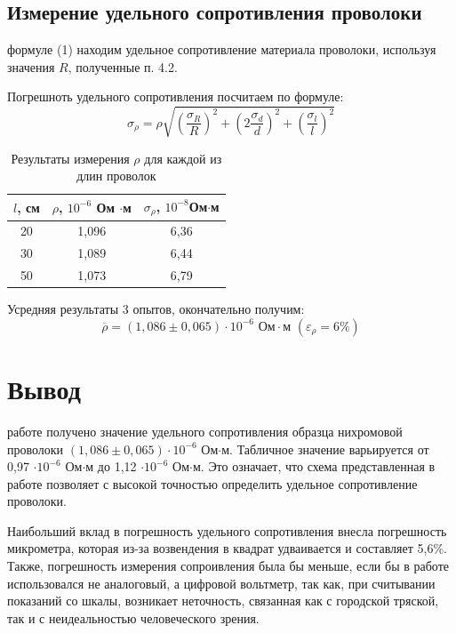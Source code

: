 \documentclass[a4paper,12pt]{article} %
\begin{document}
\subsection{Измерение удельного сопротивления проволоки}
 формуле (1) находим удельное сопротивление материала проволоки, используя значения 
$R$, полученные п. 4.2.

Погрешноть удельного сопротивления посчитаем по формуле:
\begin{equation}
\sigma_{\rho} = \rho\sqrt{\left( \frac{\sigma_R}{R} \right)^2+\left( 2\frac{\sigma_d}{d} \right)^2+\left( \frac{\sigma_l}{l} \right)^2}
\end{equation}

\begin{table}[h!]
\caption{Результаты измерения $\rho$ для каждой из длин проволок}
\centering
\begin{tabular}{|c|c|c|}
\hline 
$l$, см & $\rho$, $10^{-6}$ Ом $\cdot$м &$\sigma_{\rho}$, $10^{-8}$Ом$\cdot$м \\ 
\hline 
20 & 1,096 & 6,36 \\ 
\hline 
30 & 1,089 & 6,44 \\ 
\hline 
50 & 1,073 & 6,79 \\ 
\hline 
\end{tabular} 
\label{удсопрот}
\end{table}

Усредняя результаты 3 опытов, окончательно получим:
\begin{equation}
    \overline{\rho} = (1,086 \pm 0,065)\cdot10^{-6} 
    \text{ Ом}\cdot\text{м } (\varepsilon_\rho = 6 \%)
\end{equation}

\newpage
\section{Вывод}
 работе получено значение удельного сопротивления образца нихромовой проволоки $(1,086\pm0,065)\cdot10^{-6}$ Ом$\cdot$м. Табличное значение варьируется от 0,97 $\cdot10^{-6}$ Ом$\cdot$м до 1,12 $\cdot10^{-6}$ Ом$\cdot$м. Это означает, что схема представленная в работе позволяет с высокой точностью определить удельное сопротивление проволоки.

Наибольший вклад в погрешность удельного сопротивления внесла погрешность микрометра, которая из-за возвендения в квадрат удваивается и составляет 5,6\%. Также, погрешность измерения сопроивления была бы меньше, если бы в работе использовался не аналоговый, а цифровой вольтметр, так как, при считывании показаний со шкалы, возникает неточность, связанная как с городской тряской, так и с неидеальностью человеческого зрения.
\end{document}
